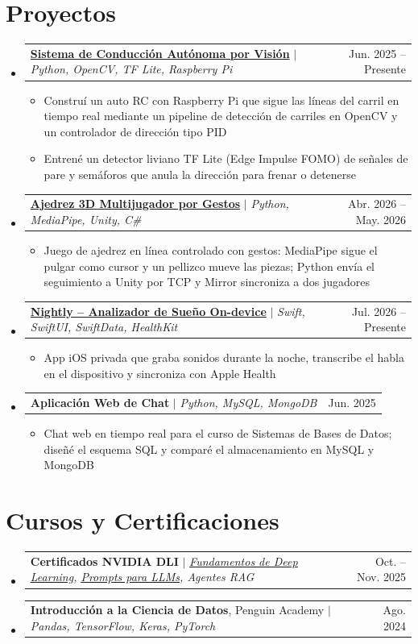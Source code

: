 \documentclass[letterpaper,11pt]{article}
\makeatletter
\newcommand{\resumeItem}[1]{
  \item\small{
    {#1 \vspace{-2pt}}
  }
}
\newcommand{\resumeProjectHeading}[2]{
    \item
    \begin{tabular*}{0.97\textwidth}{l@{\extracolsep{\fill}}r}
      \small#1 & #2 \\
    \end{tabular*}\vspace{-7pt}
}
\newcommand{\resumeSubHeadingListStart}{\begin{itemize}[leftmargin=0.15in, label={}]}
\newcommand{\resumeSubHeadingListEnd}{\end{itemize}}
\newcommand{\resumeItemListStart}{\begin{itemize}}
\newcommand{\resumeItemListEnd}{\end{itemize}\vspace{-5pt}}
\makeatother
\begin{document}
\section{Proyectos}
    \resumeSubHeadingListStart
      \resumeProjectHeading
          {\textbf{\href{https://github.com/tobiascca/Vision-based-Autonomous-Driving-System}{Sistema de Conducción Autónoma por Visión}} $|$ \emph{Python, OpenCV, TF Lite, Raspberry Pi}}{Jun. 2025 -- Presente}
          \resumeItemListStart
            \resumeItem{Construí un auto RC con Raspberry Pi que sigue las líneas del carril en tiempo real mediante un pipeline de detección de carriles en OpenCV y un controlador de dirección tipo PID}
            \resumeItem{Entrené un detector liviano TF Lite (Edge Impulse FOMO) de señales de pare y semáforos que anula la dirección para frenar o detenerse}
          \resumeItemListEnd
      \resumeProjectHeading
          {\textbf{\href{https://github.com/tobiascca/3D-Chess-with-HandTracking}{Ajedrez 3D Multijugador por Gestos}} $|$ \emph{Python, MediaPipe, Unity, C\#}}{Abr. 2026 -- May. 2026}
          \resumeItemListStart
            \resumeItem{Juego de ajedrez en línea controlado con gestos: MediaPipe sigue el pulgar como cursor y un pellizco mueve las piezas; Python envía el seguimiento a Unity por TCP y Mirror sincroniza a dos jugadores}
          \resumeItemListEnd
      \resumeProjectHeading
          {\textbf{\href{https://github.com/tobiascca/nightly-AI-sleep-analyzer-app}{Nightly -- Analizador de Sueño On-device}} $|$ \emph{Swift, SwiftUI, SwiftData, HealthKit}}{Jul. 2026 -- Presente}
          \resumeItemListStart
            \resumeItem{App iOS privada que graba sonidos durante la noche, transcribe el habla en el dispositivo y sincroniza con Apple Health}
          \resumeItemListEnd
      \resumeProjectHeading
          {\textbf{Aplicación Web de Chat} $|$ \emph{Python, MySQL, MongoDB}}{Jun. 2025}
          \resumeItemListStart
            \resumeItem{Chat web en tiempo real para el curso de Sistemas de Bases de Datos; diseñé el esquema SQL y comparé el almacenamiento en MySQL y MongoDB}
          \resumeItemListEnd
    \resumeSubHeadingListEnd

\section{Cursos y Certificaciones}
  \resumeSubHeadingListStart
    \resumeProjectHeading
      {\textbf{Certificados NVIDIA DLI} $|$ \emph{\href{https://learn.nvidia.com/certificates?id=1tO0Ys3ITkGJkXM3sgBKrQ}{\underline{Fundamentos de Deep Learning}}, \href{https://learn.nvidia.com/certificates?id=g-2IIRd1RO6ZWcYuaAXLtA}{\underline{Prompts para LLMs}}, Agentes RAG}}{Oct. -- Nov. 2025}
    \resumeProjectHeading
      {\textbf{Introducción a la Ciencia de Datos}, Penguin Academy $|$ \emph{Pandas, TensorFlow, Keras, PyTorch}}{Ago. 2024}
  \resumeSubHeadingListEnd
\end{document}
